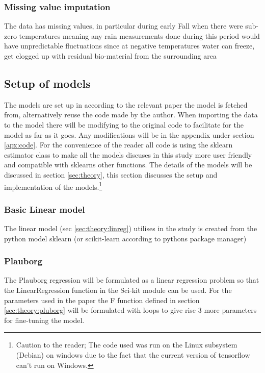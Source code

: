 \subsubsection{Missing value imputation}

The data has missing values, in particular during early Fall when there were sub-zero temperatures meaning any rain measurements done during this period would have unpredictable fluctuations since at negative temperatures water can freeze, get clogged up with residual bio-material from the surrounding area 

\subsection{Setup of models}

The models are set up in according to the relevant paper the model is fetched from, alternatively reuse the code made by the author. When importing the data to the model there will be modifying to the original code to facilitate for the model as far as it goes. Any modifications will be in the appendix under section \ref{apx:code}. For the convenience of the reader all code is using the sklearn estimator class to make all the models discuses in this study more user friendly and compatible with sklearns other functions. The details of the models will be discussed in section \ref{sec:theory}, this section discusses the setup and implementation of the models.\footnote{Caution to the reader; The code used was run on the Linux subsystem (Debian) on windows due to the fact that the current version of tensorflow can't run on Windows.}

\subsubsection{Basic Linear model}

The linear model (sec \ref{sec:theory:linreg}) utilises in the study is created from the python model sklearn (or scikit-learn according to pythons package manager) 

\subsubsection{Plauborg}

The Plauborg regression will be formulated as a linear regression problem so that the LinearRegression function in the Sci-kit module can be used. For the parameters used in the paper\cite{plauborg_simple_2002} the F function defined in section \ref{sec:theory:pluborg} will be formulated with loops to give rise 3 more parameters for fine-tuning the model.

